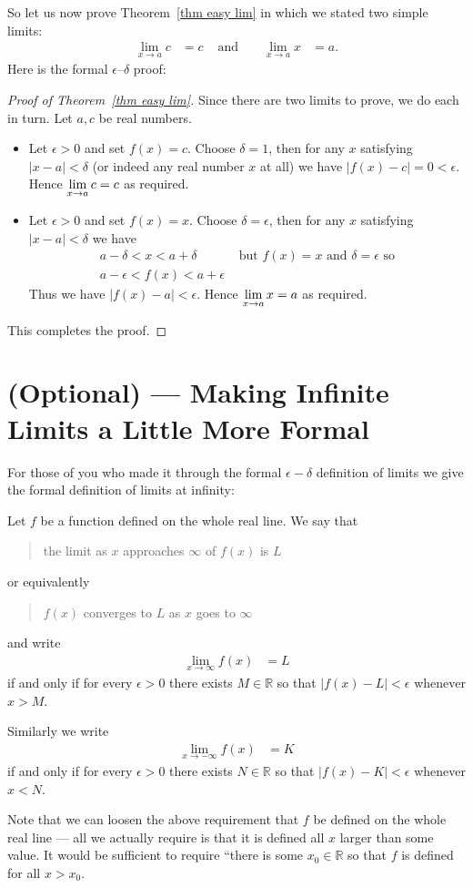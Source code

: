 So let us now prove Theorem~\ref{thm easy lim} in which we stated two simple
limits:
\begin{align*}
  \lim_{x \to a} c &= c & \text{ and } && \lim_{x \to a} x &= a.
\end{align*}
Here is the formal $\epsilon$--$\delta$ proof:
\begin{proof}[Proof of Theorem~\ref{thm easy lim}]
 Since there are two limits to prove, we do each in turn. Let $a,c$ be real
numbers.
\begin{itemize}
 \item Let $\epsilon>0$ and set $f(x)=c$. Choose $\delta=1$, then for any
$x$ satisfying $|x-a|<\delta$ (or indeed any real number $x$ at all) we have
$|f(x)-c| = 0 <\epsilon$. Hence $\displaystyle \lim_{x \to a} c = c$ as required.

 \item Let $\epsilon>0$ and set $f(x)=x$. Choose $\delta=\epsilon$, then for
any $x$ satisfying $|x-a|<\delta$ we have
\begin{align*}
  a-\delta < x < a+\delta & \text{ but $f(x) = x$ and $\delta=\epsilon$ so} \\
  a-\epsilon < f(x) < a+\epsilon
\end{align*}
Thus we have $|f(x)-a|<\epsilon$. Hence $\displaystyle \lim_{x \to a} x = a$ as required.
\end{itemize}
This completes the proof.
\end{proof}


\section{(Optional) --- Making Infinite Limits a Little More Formal}
\label{sec lim inf formal}
For those of you who made it through the formal $\epsilon-\delta$ definition of
limits we give the formal definition of limits at infinity:
\begin{defn}
 Let $f$ be a function defined on the whole real line. We say that
\begin{quote}
  the limit as $x$ approaches $\infty$ of $f(x)$ is $L$
\end{quote}
or equivalently
\begin{quote}
 $f(x)$ converges to $L$ as $x$ goes to $\infty$
\end{quote}
and write
\begin{align*}
  \lim_{x \to \infty} f(x) &= L
\end{align*}
if and only if for every $\epsilon>0$ there exists $M \in \mathbb{R}$ so that
$|f(x)-L| < \epsilon$ whenever $x>M$.

Similarly we write
\begin{align*}
  \lim_{x \to -\infty} f(x) &= K
\end{align*}
if and only if for every $\epsilon>0$ there exists $N \in \mathbb{R}$ so that
$|f(x)-K| < \epsilon$ whenever $x<N$.

\end{defn}
Note that we can loosen the above requirement that $f$ be defined on the whole real line
--- all we actually require is that it is defined all $x$ larger than some value. It
would be sufficient to require ``there is some $x_0 \in \mathbb{R}$ so that $f$ is
defined for all $x>x_0$.

